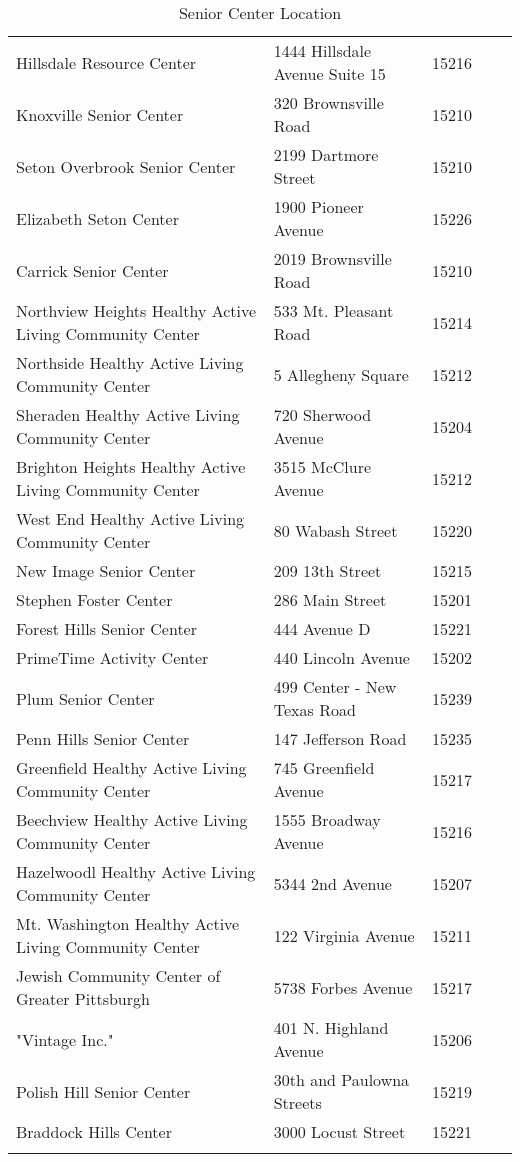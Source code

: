 \begin{longtable}{ p{2.5in}| l | l  p{3in}  l}
Hillsdale Resource Center&1444 Hillsdale Avenue Suite 15&15216\\
Knoxville Senior Center&320 Brownsville Road&15210\\
Seton Overbrook Senior Center&2199 Dartmore Street&15210\\
Elizabeth Seton Center&1900 Pioneer Avenue&15226\\
Carrick Senior Center&2019 Brownsville Road&15210\\
Northview Heights Healthy Active Living Community Center&533 Mt. Pleasant Road&15214\\
Northside Healthy Active Living Community Center&5 Allegheny Square&15212\\
Sheraden Healthy Active Living Community Center&720 Sherwood Avenue&15204\\
Brighton Heights Healthy Active Living Community Center&3515 McClure Avenue&15212\\
West End Healthy Active Living Community Center&80 Wabash Street&15220\\
New Image Senior Center&209 13th Street&15215\\
Stephen Foster Center&286 Main Street&15201\\
Forest Hills Senior Center&444 Avenue D&15221\\
PrimeTime Activity Center&440 Lincoln Avenue&15202\\
Plum Senior Center&499 Center - New Texas Road&15239\\
Penn Hills Senior Center &147 Jefferson Road&15235\\
Greenfield Healthy Active Living Community Center&745 Greenfield Avenue&15217\\
Beechview Healthy Active Living Community Center&1555 Broadway Avenue&15216\\
Hazelwoodl Healthy Active Living Community Center&5344 2nd Avenue&15207\\
Mt. Washington Healthy Active Living Community Center&122 Virginia Avenue&15211\\
Jewish Community Center of Greater Pittsburgh&5738 Forbes Avenue&15217\\
"Vintage Inc."&401 N. Highland Avenue&15206\\
Polish Hill Senior Center&30th and Paulowna Streets&15219\\
Braddock Hills Center&3000 Locust Street&15221\\
\caption{Senior Center Location}
\label{tab:seniorCenter}
\end{longtable}